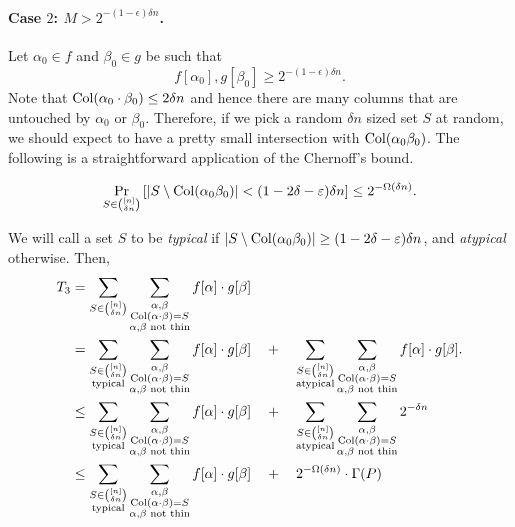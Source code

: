 \paragraph{Case $2$: $M > 2^{-(1-\epsilon) \delta n}$.} Let $\alpha_0 \in f$ and $\beta_0\in g$ be such that
\[
f[\alpha_0], g[\beta_0] \geq 2^{-(1-\epsilon) \delta n}.
\]
Note that $\operatorname{Col}(\alpha_0 \cdot \beta_0) \leq 2\delta n$ and hence there are many columns that are untouched by $\alpha_0$ or $\beta_0$. Therefore, if we pick a random $\delta n$ sized set $S$ at random, we should expect to have a pretty small intersection with $\operatorname{Col}(\alpha_0 \beta_0)$. The following is a straightforward application of the Chernoff's bound.
\begin{claim}
  \[
    \Pr_{S \in \binom{[n]}{\delta n}}\left[\left|S \setminus \operatorname{Col}(\alpha_0 \beta_0)\right| < (1 - 2\delta - \varepsilon)\delta n \right] \leq 2^{-\Omega(\delta n)}.
  \]
\end{claim}
We will call a set $S$ to be \emph{typical} if $\left|S \setminus \operatorname{Col}(\alpha_0 \beta_0)\right| \geq (1 - 2\delta - \varepsilon)\delta n$, and \emph{atypical} otherwise. Then,
\begin{align*}
  T_3 & = \sum_{S \in \binom{[n]}{\delta n}} \sum_{\substack{\alpha, \beta\\ \operatorname{Col}(\alpha \cdot \beta) = S \\ \text{$\alpha$,$\beta$ not thin}}} f[\alpha] \cdot g[\beta]\\
      & = \sum_{\substack{S \in \binom{[n]}{\delta n}\\\text{typical}}} \sum_{\substack{\alpha, \beta\\ \operatorname{Col}(\alpha \cdot \beta) = S \\ \text{$\alpha$,$\beta$ not thin}}} f[\alpha] \cdot g[\beta]  \quad+\quad \sum_{\substack{S \in \binom{[n]}{\delta n}\\\text{atypical}}} \sum_{\substack{\alpha, \beta\\ \operatorname{Col}(\alpha \cdot \beta) = S \\ \text{$\alpha$,$\beta$ not thin}}} f[\alpha] \cdot g[\beta].\\
      & \leq \sum_{\substack{S \in \binom{[n]}{\delta n}\\\text{typical}}} \sum_{\substack{\alpha, \beta\\ \operatorname{Col}(\alpha \cdot \beta) = S \\ \text{$\alpha$,$\beta$ not thin}}} f[\alpha] \cdot g[\beta]  \quad+\quad \sum_{\substack{S \in \binom{[n]}{\delta n}\\\text{atypical}}} \sum_{\substack{\alpha, \beta\\ \operatorname{Col}(\alpha \cdot \beta) = S \\ \text{$\alpha$,$\beta$ not thin}}} 2^{-\delta n}\\
  & \leq \sum_{\substack{S \in \binom{[n]}{\delta n}\\\text{typical}}} \sum_{\substack{\alpha, \beta\\ \operatorname{Col}(\alpha \cdot \beta) = S \\ \text{$\alpha$,$\beta$ not thin}}} f[\alpha] \cdot g[\beta]  \quad+\quad 2^{-\Omega(\delta n)} \cdot \Gamma(P)
\end{align*}
